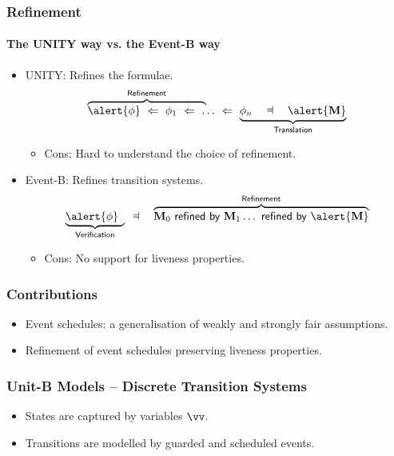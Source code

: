 \begin{frame}
  \frametitle{Refinement}
  \framesubtitle{The UNITY way vs. the Event-B way}


  \begin{itemize}
  \item UNITY: Refines the \alert{formulae}.
    \[
    \lefteqn{\overbrace{\phantom{\phi \wide\follows \phi_1
          \wide\follows \ldots \wide\follows
          \phi_n}}^{\textsf{Refinement}}} \alert{\phi} \wide\follows \phi_1
    \wide\follows \ldots \wide\follows \underbrace{\phi_n \WIDE\dashV
      \alert{\Mch}}_{\textsf{Translation}}
    \]
    \begin{itemize}
    \item<2-> Cons: \alert{Hard to understand} the choice of refinement.
    \end{itemize}
    \medskip

  \item Event-B: Refines \alert{transition systems}.
    \[
    \lefteqn{
      \underbrace{\phantom{\phi \WIDE\dashV
        \Mch_0}}_{\textsf{Verification}}}  \alert{\phi} \WIDE\dashV
        \overbrace{\Mch_0 \wide\abstracts \Mch_1 \ldots \wide\abstracts \alert{\Mch}}^{\textsf{Refinement}}
    \]
    \begin{itemize}
    \item<2-> Cons: No support for \alert{liveness properties}.
    \end{itemize}
  \end{itemize}

\end{frame}

\begin{frame}
  \frametitle{Contributions}

  \begin{itemize}
  \item Event schedules: a generalisation of weakly and strongly fair
    assumptions.
    \medskip
  \item Refinement of event schedules preserving liveness properties.
  \end{itemize}
\end{frame}

\begin{frame}
  \frametitle{Unit-B Models -- Discrete Transition Systems}

  \begin{itemize}
  \item States are captured by \alert{variables $\vv$}.
    \medskip
  \item Transitions are modelled by \alert{guarded and scheduled events}.
  \end{itemize}

\end{frame}


